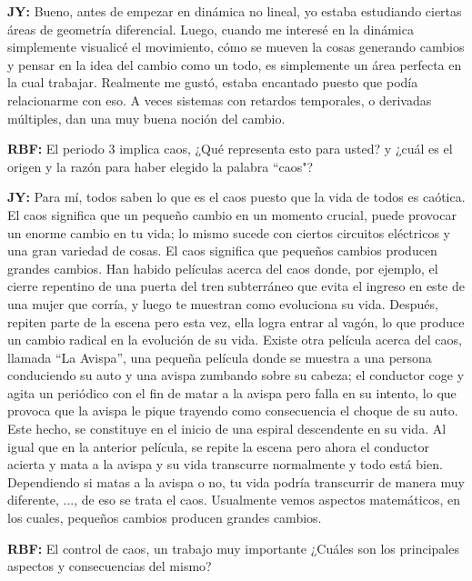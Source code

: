 \documentclass{rbf}
\newcommand{\mr}{{\bf RBF: }}
\newcommand{\jim}{{\bf JY: }}
\begin{document}
\jim Bueno, antes de empezar en dinámica no lineal, yo estaba estudiando ciertas áreas de geometría diferencial. Luego, cuando me interesé en la dinámica simplemente visualicé el movimiento, cómo se mueven la cosas generando cambios y pensar en la idea del cambio como un todo, es simplemente un área perfecta en la cual trabajar. Realmente me gustó, estaba encantado puesto que podía relacionarme con eso. A veces sistemas con retardos temporales, o derivadas múltiples, dan una muy buena noción del cambio.

\mr El periodo 3 implica caos, ¿Qué representa esto para usted? y ¿cuál es el origen y la razón para haber elegido la palabra ``caos"?

\jim Para mí, todos saben lo que es el caos puesto que la vida de todos es caótica. El caos significa que un pequeño cambio en un momento crucial, puede provocar un enorme cambio en tu vida; lo mismo sucede con ciertos circuitos eléctricos y una gran variedad de cosas. El caos significa que pequeños cambios producen grandes cambios. Han habido películas acerca del caos donde, por ejemplo, el cierre repentino de una puerta del tren subterráneo que evita el ingreso en este de una mujer que corría, y luego te muestran como evoluciona su vida. Después, repiten parte de la escena pero esta vez, ella logra entrar al vagón, lo que produce un cambio radical en la evolución de su vida. Existe otra película acerca del caos, llamada ``La Avispa'', una pequeña película donde se muestra a una persona conduciendo su auto y una avispa zumbando sobre su cabeza; el conductor coge y agita un periódico con el fin de matar a la avispa pero falla en su intento, lo que provoca que la avispa le pique trayendo como consecuencia el choque de su auto. Este hecho, se constituye en el inicio de una espiral descendente en su vida. Al igual que en la anterior película, se repite la escena pero ahora el conductor acierta y mata a la avispa y su vida transcurre normalmente y todo está bien. Dependiendo si matas a la avispa o no,
tu vida podría transcurrir de manera muy diferente, ..., de eso se trata el caos. Usualmente vemos aspectos matemáticos, en los cuales, pequeños cambios producen grandes cambios.

\mr El control de caos, un trabajo muy importante ¿Cuáles son los principales aspectos y consecuencias del mismo?
\end{document}
